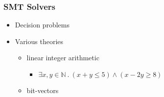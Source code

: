 
\begin{frame}

\frametitle{SMT Solvers}

\begin{itemize}

\item<1-> Decision problems

\item<2-> Various theories

\begin{itemize}

\item<3-> linear integer arithmetic

\begin{itemize}

\item $\exists x,y \in \mathbb{N}~.~(x+y \leq 5) \wedge (x-2y \geq 8)$

\end{itemize}

\item<4-> bit-vectors


\end{itemize}
\end{itemize}
\end{frame}
